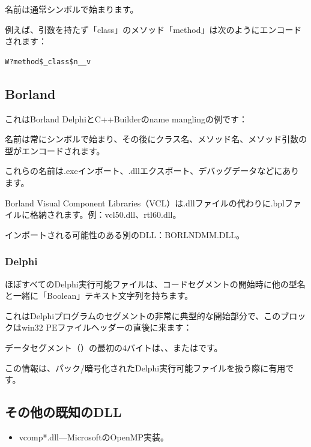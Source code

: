 名前は通常シンボルで始まります。

例えば、引数を持たず「class」のメソッド「method」は次のようにエンコードされます：

\begin{lstlisting}
W?method$_class$n__v
\end{lstlisting}

\subsection{Borland}

これはBorland DelphiとC++Builderの\gls{name mangling}の例です：



名前は常にシンボルで始まり、その後にクラス名、メソッド名、メソッド引数の型がエンコードされます。

これらの名前は.exeインポート、.dllエクスポート、デバッグデータなどにあります。

Borland Visual Component Libraries（VCL）は.dllファイルの代わりに.bplファイルに格納されます。例：vcl50.dll、rtl60.dll。

インポートされる可能性のある別のDLL：BORLNDMM.DLL。

\subsubsection{Delphi}

ほぼすべてのDelphi実行可能ファイルは、コードセグメントの開始時に他の型名と一緒に「Boolean」テキスト文字列を持ちます。

これはDelphiプログラムのセグメントの非常に典型的な開始部分で、このブロックはwin32 PEファイルヘッダーの直後に来ます：



データセグメント（）の最初の4バイトは、、またはです。%

この情報は、パック/暗号化されたDelphi実行可能ファイルを扱う際に有用です。

\subsection{その他の既知のDLL}

\begin{itemize}
\item vcomp*.dll---MicrosoftのOpenMP実装。
\end{itemize}